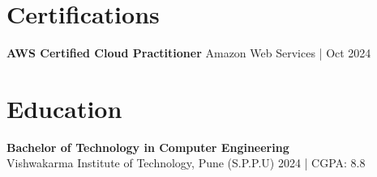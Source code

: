 \documentclass[letterpaper,10pt]{article}
\begin{document}
\section*{Certifications}
\textbf{AWS Certified Cloud Practitioner} \hfill Amazon Web Services \;|\; Oct 2024 \\

\section*{Education}

\textbf{Bachelor of Technology in Computer Engineering} \\
Vishwakarma Institute of Technology, Pune (S.P.P.U) \hfill 2024 \;|\; CGPA: 8.8
\end{document}
